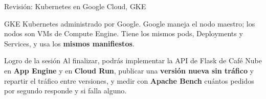 \documentclass[aspectratio=169,10pt,c]{beamer}
\begin{document}
\begin{frame}{Revisión: Kubernetes en Google Cloud, GKE}
\begin{center}
\end{center}
\vspace{2mm}
\begin{center}
\begin{minipage}{.72\textwidth}
\begin{block}{GKE}
\small Kubernetes administrado por Google. Google maneja el nodo maestro; los nodos son VMs de Compute Engine. Tiene los mismos pods, Deployments y Services, y usa los \textbf{mismos manifiestos}.
\end{block}
\end{minipage}
\end{center}
\end{frame}

\begin{frame}[c]
\begin{block}{Logro de la sesión}
Al finalizar, podrás implementar la API de Flask de Café Nube en \textbf{App Engine} y en \textbf{Cloud Run}, publicar una \textbf{versión nueva sin tráfico} y repartir el tráfico entre versiones, y medir con \textbf{Apache Bench} cuántos pedidos por segundo responde y si falla alguno.
\end{block}
\end{frame}
\end{document}
